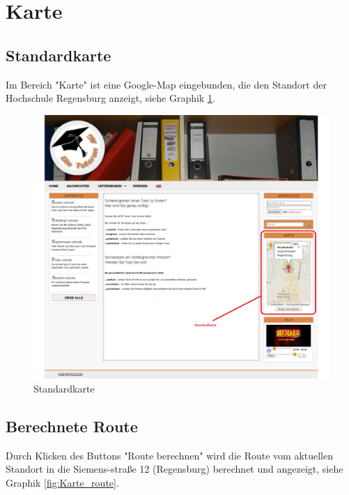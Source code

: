 
\section{Karte}

\subsection{Standardkarte}

Im Bereich "Karte" ist eine Google-Map eingebunden, die den Standort der Hochschule Regensburg anzeigt, siehe Graphik \ref{fig:Karte}.

\begin{figure}[!htbp]
 \centering
 \includegraphics[width=1\textwidth]{../Screenshots/Karte}
 \caption{Standardkarte}
 \label{fig:Karte}
\end{figure}

\newpage

\subsection{Berechnete Route}

Durch Klicken des Buttons "Route berechnen" wird die Route vom aktuellen Standort in die Siemens-straße 12 (Regensburg) berechnet und angezeigt, siehe Graphik \ref{fig:Karte_route}.

